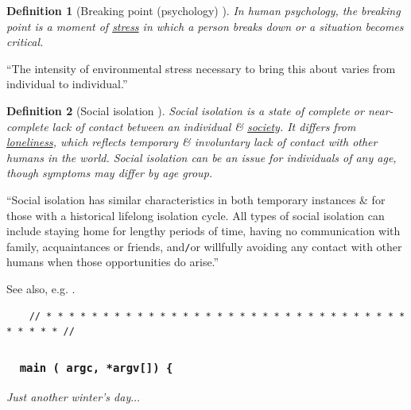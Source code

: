 \documentclass[12pt]{article}
\newtheorem{definition}{Definition}[section]
\begin{document}
\begin{definition}[Breaking point (psychology) \cite{Wikepedia/Breaking point (psychology)}]
	In human psychology, the \emph{breaking point} is a moment of \href{https://en.wikipedia.org/wiki/Stress_(medicine)}{stress} in which a person breaks down or a situation becomes critical.
\end{definition}
``The intensity of environmental stress necessary to bring this about varies from individual to individual.''

\begin{definition}[Social isolation \cite{Wikipedia/Social isolation}]
	\emph{Social isolation} is a state of complete or near-complete lack of contact between an individual \& \href{https://en.wikipedia.org/wiki/Society}{society}. It differs from \href{https://en.wikipedia.org/wiki/Loneliness}{loneliness}, which reflects temporary \& involuntary lack of contact with other humans in the world. Social isolation can be an issue for individuals of any age, though symptoms may differ by age group.
\end{definition}
``Social isolation has similar characteristics in both temporary instances \& for those with a historical lifelong isolation cycle. All types of social isolation can include staying home for lengthy periods of time, having no communication with family, acquaintances or friends, and{\tt/}or willfully avoiding any contact with other humans when those opportunities do arise.''

See also, e.g. \cite{NASEM2020,NhuTrang2020}.

\begin{verbatim}
	// * * * * * * * * * * * * * * * * * * * * * * * * * * * * * * * * * * * * * //
\end{verbatim}

\subsubsection{{\tt {\color{cyan}{\it int}} {\color{YellowGreen} main} ({\color{cyan}{\it int}} argc, {\color{cyan}{\it char}} *argv[]) \{}}

 {\it Just another winter's day}$\ldots$
\end{document}
